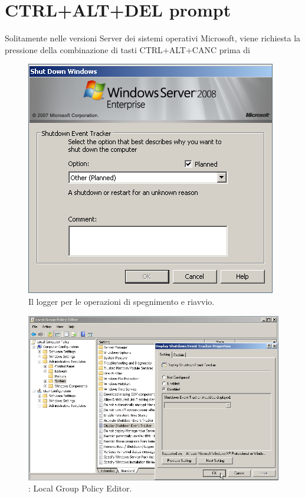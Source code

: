 \section{CTRL+ALT+DEL prompt}
Solitamente nelle versioni Server dei sistemi operativi Microsoft, viene richiesta
la pressione della combinazione di tasti CTRL+ALT+CANC prima di

\begin{figure}[htbp]
 \centering
 \includegraphics[scale=0.5]{images/grab0018}
 \caption{Il logger per le operazioni di spegnimento e riavvio.}
\label{fig:grab0018}
\end{figure}

\begin{figure}[htbp]
 \centering
 \includegraphics[scale=0.5]{images/grab0024}
 \caption{: Local Group Policy Editor.}
\label{fig:grab0024}
\end{figure}

